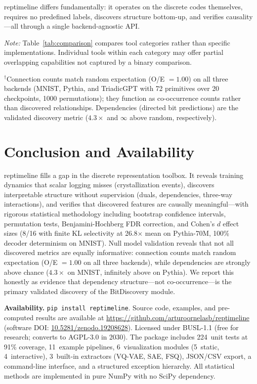 \documentclass[11pt]{article}
\begin{document}
reptimeline differs fundamentally: it operates on the discrete codes themselves, requires no predefined labels, discovers structure bottom-up, and verifies causality---all through a single backend-agnostic API.

\noindent\textit{Note:} Table~\ref{tab:comparison} compares tool categories rather than specific implementations. Individual tools within each category may offer partial overlapping capabilities not captured by a binary comparison.

\noindent$^\dagger$Connection counts match random expectation (O/E $= 1.00$) on all three backends (MNIST, Pythia, and TriadicGPT with 72 primitives over 20 checkpoints, 1000 permutations); they function as co-occurrence counts rather than discovered relationships. Dependencies (directed bit predictions) are the validated discovery metric ($4.3\times$ and $\infty$ above random, respectively).


\section{Conclusion and Availability}
\label{sec:conclusion}

reptimeline fills a gap in the discrete representation toolbox. It reveals training dynamics that scalar logging misses (crystallization events), discovers interpretable structure without supervision (duals, dependencies, three-way interactions), and verifies that discovered features are causally meaningful---with rigorous statistical methodology including bootstrap confidence intervals, permutation tests, Benjamini-Hochberg FDR correction, and Cohen's $d$ effect sizes (8/16 with finite KL selectivity at 26.8$\times$ mean on Pythia-70M, 100\% decoder determinism on MNIST). Null model validation reveals that not all discovered metrics are equally informative: connection counts match random expectation (O/E $= 1.00$ on all three backends), while dependencies are strongly above chance ($4.3\times$ on MNIST, infinitely above on Pythia). We report this honestly as evidence that dependency structure---not co-occurrence---is the primary validated discovery of the BitDiscovery module.

\textbf{Availability.} \texttt{pip install reptimeline}. Source code, examples, and pre-computed results are available at \url{https://github.com/arturoornelasb/reptimeline} (software DOI: \href{https://doi.org/10.5281/zenodo.19208628}{10.5281/zenodo.19208628}). Licensed under BUSL-1.1 (free for research; converts to AGPL-3.0 in 2030). The package includes 224~unit tests at 91\% coverage, 11~example pipelines, 6~visualization modules (5~static, 4~interactive), 3~built-in extractors (VQ-VAE, SAE, FSQ), JSON/CSV export, a command-line interface, and a structured exception hierarchy. All statistical methods are implemented in pure NumPy with no SciPy dependency.
\end{document}
